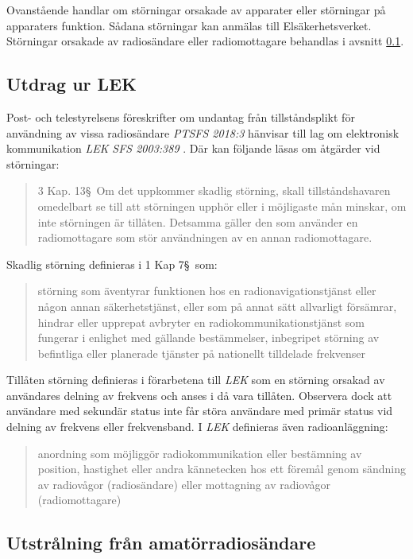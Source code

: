 Ovanstående handlar om störningar orsakade av apparater eller störningar på
apparaters funktion.
Sådana störningar kan anmälas till Elsäkerhetsverket.
Störningar orsakade av radiosändare eller radiomottagare behandlas i avsnitt
\ref{LEK}.


\subsection{Utdrag ur LEK}
\label{LEK}

Post- och telestyrelsens föreskrifter om undantag från tillståndsplikt för
användning av vissa radiosändare \emph{PTSFS 2018:3} \cite{PTSFS2018:3} hänvisar
till lag om elektronisk kommunikation \emph{LEK} \emph{SFS 2003:389}
\cite{SFS2003:389}.
Där kan följande läsas om åtgärder vid störningar:
\begin{quote}
	3 Kap. 13\S~Om det uppkommer skadlig störning, skall tillståndshavaren
	omedelbart se till att störningen upphör eller i möjligaste mån minskar, om
	inte störningen är tillåten.
	Detsamma gäller den som använder en radiomottagare som stör användningen av en
	annan radiomottagare.
\end{quote}
Skadlig störning definieras i 1 Kap 7\S~som:
\begin{quote}
	störning som äventyrar funktionen hos en radionavigationstjänst eller någon
	annan säkerhetstjänst, eller som på annat sätt allvarligt försämrar,
	hindrar eller upprepat avbryter en radiokommunikationstjänst som fungerar i
	enlighet med gällande bestämmelser, inbegripet störning av befintliga eller
	planerade tjänster på nationellt tilldelade frekvenser
\end{quote}
Tillåten störning definieras i förarbetena till \emph{LEK} som en störning
orsakad av användares delning av frekvens och anses i då vara tillåten.
Observera dock att användare med sekundär status inte får störa användare med
primär status vid delning av frekvens eller frekvensband.
I \emph{LEK} definieras även radioanläggning:
\begin{quote}
	anordning som möjliggör radiokommunikation eller bestämning av position,
	hastighet eller andra kännetecken hos ett föremål genom sändning av radiovågor
	(radiosändare) eller mottagning av radiovågor (radiomottagare)
\end{quote}

\subsection{Utstrålning från amatörradiosändare}

